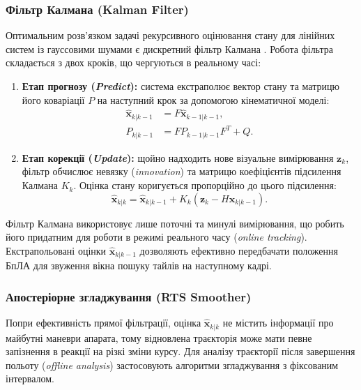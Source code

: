 \documentclass[a4paper, 12pt, titlepage]{article}
\begin{document}
\subsubsection{Фільтр Калмана (Kalman Filter)}
Оптимальним розв'язком задачі рекурсивного оцінювання стану для лінійних систем із гауссовими шумами є дискретний фільтр Калмана \cite{kalman}. Робота фільтра складається з двох кроків, що чергуються в реальному часі:
\begin{enumerate}
    \item \textbf{Етап прогнозу (\textit{Predict}):} система екстраполює вектор стану та матрицю його коваріації $P$ на наступний крок за допомогою кінематичної моделі:
    \begin{align}
    \hat{\mathbf{x}}_{k|k-1} &= F \hat{\mathbf{x}}_{k-1|k-1}, \\
    P_{k|k-1} &= F P_{k-1|k-1} F^T + Q.
    \end{align}
    \item \textbf{Етап корекції (\textit{Update}):} щойно надходить нове візуальне вимірювання $\mathbf{z}_k$, фільтр обчислює невязку (\textit{innovation}) та матрицю коефіцієнтів підсилення Калмана $K_k$. Оцінка стану коригується пропорційно до цього підсилення:
    \begin{equation}
    \hat{\mathbf{x}}_{k|k} = \hat{\mathbf{x}}_{k|k-1} + K_k (\mathbf{z}_k - H \hat{\mathbf{x}}_{k|k-1}).
    \end{equation}
\end{enumerate}
Фільтр Калмана використовує лише поточні та минулі вимірювання, що робить його придатним для роботи в режимі реального часу (\textit{online tracking}). Екстрапольовані оцінки $\hat{\mathbf{x}}_{k|k-1}$ дозволяють ефективно передбачати положення БпЛА для звуження вікна пошуку тайлів на наступному кадрі.

\subsubsection{Апостеріорне згладжування (RTS Smoother)}
Попри ефективність прямої фільтрації, оцінка $\hat{\mathbf{x}}_{k|k}$ не містить інформації про майбутні маневри апарата, тому відновлена траєкторія може мати певне запізнення в реакції на різкі зміни курсу. Для аналізу траєкторії після завершення польоту (\textit{offline analysis}) застосовують алгоритми згладжування з фіксованим інтервалом.
\end{document}

